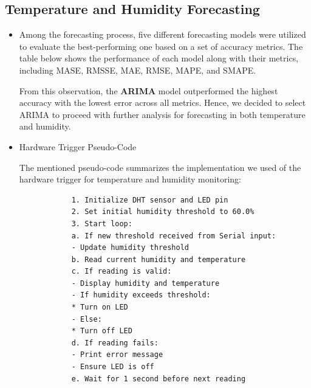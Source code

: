\documentclass[12pt]{article}
\begin{document}
	\subsection{Temperature and Humidity Forecasting}
	\begin{itemize}
		
		\item Among the forecasting process, five different forecasting models were utilized to evaluate the best-performing one based on a set of accuracy metrics. The table below shows the performance of each model along with their metrics, including MASE, RMSSE, MAE, RMSE, MAPE, and SMAPE.
		
		\begin{table}[H]
			\caption{Performance Metrics for Forecasting Models}
			\label{tab:FORECAST_METRICS}
			\vspace{0.25 cm}
		\end{table}
		
		
		From this observation, the \textbf{ARIMA} model outperformed the highest accuracy with the lowest error across all metrics. Hence, we decided to select ARIMA to proceed with further analysis for forecasting in both temperature and humidity.
		
		
		\item{Hardware Trigger Pseudo-Code}
		
		The mentioned pseudo-code summarizes the implementation we used of the hardware trigger for temperature and humidity monitoring:
		
		\begin{verbatim}
			1. Initialize DHT sensor and LED pin
			2. Set initial humidity threshold to 60.0%
			3. Start loop:
			a. If new threshold received from Serial input:
			- Update humidity threshold
			b. Read current humidity and temperature
			c. If reading is valid:
			- Display humidity and temperature
			- If humidity exceeds threshold:
			* Turn on LED
			- Else:
			* Turn off LED
			d. If reading fails:
			- Print error message
			- Ensure LED is off
			e. Wait for 1 second before next reading
		\end{verbatim}
		

\end{itemize}
\end{document}
